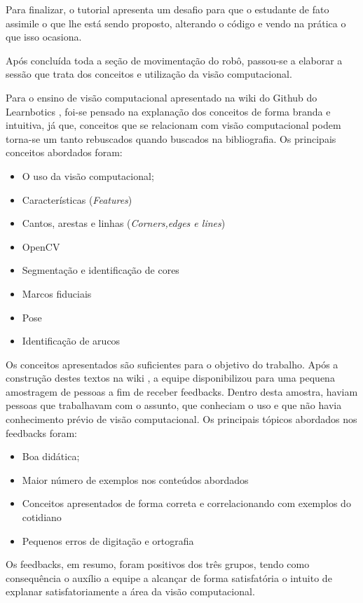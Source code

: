 Para finalizar, o tutorial apresenta um desafio para que o estudante de fato assimile o que lhe está sendo proposto, alterando o código e vendo na prática o que isso ocasiona. \cite{tutCinemat}

Após concluída toda a seção de movimentação do robô, passou-se a elaborar a sessão que trata dos conceitos e utilização da visão computacional. 

Para o ensino de visão computacional apresentado na wiki do Github do Learnbotics \cite{wikilearn}, foi-se pensado na explanação dos conceitos de forma branda e intuitiva, já que, conceitos que se relacionam com visão computacional podem torna-se um tanto rebuscados quando buscados na bibliografia. Os principais conceitos abordados foram:
\begin{itemize}
	\item O uso da visão computacional;
	\item Características  (\textit{Features})
	\item Cantos, arestas e linhas (\textit{Corners,edges e lines})
	\item OpenCV
	\item Segmentação e identificação de cores
	\item Marcos fiduciais
	\item Pose
	\item Identificação de arucos
	
\end{itemize}

Os conceitos apresentados são suficientes para o objetivo do trabalho. Após a construção destes textos na wiki \cite{tutVis}, a equipe disponibilizou para uma pequena amostragem de pessoas a fim de receber feedbacks. Dentro desta amostra, haviam pessoas que trabalhavam com o assunto, que conheciam o uso e que não havia conhecimento prévio de visão computacional. Os principais tópicos abordados nos feedbacks foram:

\begin{itemize}
	\item Boa didática;
	\item Maior número de exemplos nos conteúdos abordados
	\item Conceitos apresentados de forma correta e correlacionando com exemplos do cotidiano
	\item Pequenos erros de digitação e ortografia
\end{itemize}

Os feedbacks, em resumo, foram positivos dos três grupos, tendo como consequência o auxílio a equipe a alcançar de forma satisfatória o intuito de explanar satisfatoriamente a área da visão computacional.

